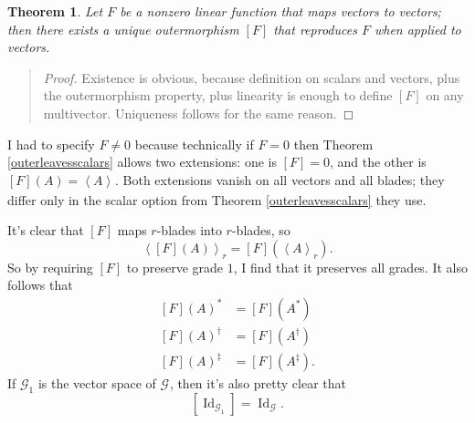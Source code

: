 \documentclass{utarticle}
\newcommand{\G}[1][]{\ensuremath{\mathcal{G}_{#1}}}
\newcommand{\Id}{\operatorname{Id}}
\newcommand{\grinv}[2][]{\ensuremath{#2^{*#1}}}
\newcommand{\rev}[1]{\ensuremath{#1^\dagger}}
\newcommand{\clifconj}[1]{\ensuremath{#1^\ddagger}}
\newcommand{\grade}[2][]{\ensuremath{\left\langle #2 \right\rangle_{#1}}}
\newcommand{\Out}[1]{\ensuremath{\left[#1\right]}}
\newtheorem{thm}{Theorem}
\newcommand{\bp}{\begin{quotation} \begin{proof}}
\newcommand{\ep}{\end{proof} \end{quotation}}
\begin{document}
\begin{thm}
Let $F$ be a nonzero linear function that maps vectors to vectors; then there exists
a unique outermorphism \Out{F} that reproduces $F$ when applied to vectors.
\end{thm}
\bp
Existence is obvious, because definition on scalars and vectors, plus the outermorphism
property, plus linearity is enough to define \Out{F} on any multivector.  Uniqueness follows 
for the same reason.
\ep

I had to specify $F \neq 0$ because technically if $F = 0$ then Theorem \ref{outerleavesscalars} 
allows two extensions: one is $\Out{F} = 0$, and the other is $\Out{F}(A) = \grade{A}$.  
Both extensions vanish on all vectors and all blades; they differ only in the scalar option 
from Theorem \ref{outerleavesscalars} they use.

It's clear that \Out{F} maps $r$-blades into $r$-blades, so
\begin{equation}
\grade[r]{\Out{F}(A)} = \Out{F}(\grade[r]{A}).
\end{equation}
So by requiring \Out{F} to preserve grade $1$, I find that it preserves all grades.  
It also follows that
\begin{align} 
\grinv{\Out{F}(A)} & = \Out{F}(\grinv{A}) \nonumber \\
\rev{\Out{F}(A)} & = \Out{F}(\rev{A}) \nonumber \\
\clifconj{\Out{F}(A)} & = \Out{F}(\clifconj{A}).
\end{align}
If \G[1] is the vector space of \G, then it's also pretty clear that
\begin{equation} \Out{\Id_{\G[1]}} = \Id_{\G}. \end{equation}
\end{document}
